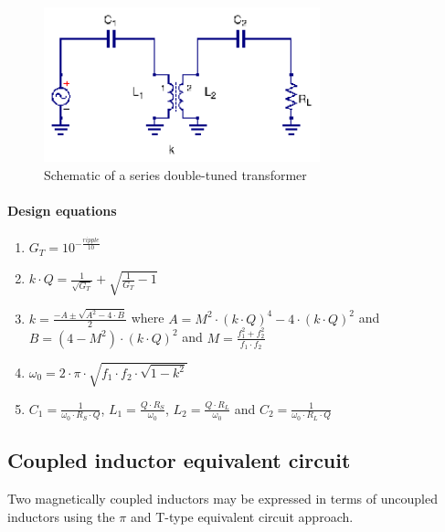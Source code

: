 \begin{figure}[H]
\centering
\includegraphics[width=80mm]{./images/Synthesis/Impedance_Matching/series-double-tuned-transformer}
\caption{Schematic of a series double-tuned transformer}
\label{fig:series-double-tuned-transformer}
\end{figure}

\paragraph{Design equations \cite{RFMW_amp_osc_Abrie}}

\begin{enumerate}
   \item $G_T = 10^{- \frac{ripple}{10}}$
   \item $k\cdot Q = \frac{1}{\sqrt{G_T}} + \sqrt{\frac{1}{G_T} - 1}$
   \item $k = \frac{-A \pm \sqrt{A^2 - 4 \cdot B}}{2}$ where $A = M^2 \cdot (k\cdot Q)^4 - 4 \cdot (k\cdot Q)^2$ and $B = (4 - M^2) \cdot (k\cdot Q)^2$ and $M = \frac{f_1^2 + f_2^2}{f_1 \cdot f_2}$
   \item $\omega_0 = 2 \cdot \pi \cdot \sqrt{f_1 \cdot f_2 \cdot \sqrt{1 - k^2}}$
   \item $C_1 = \frac{1}{\omega_0 \cdot R_S \cdot Q}$, $L_1 = \frac{Q \cdot R_S}{\omega_0}$, $L_2 = \frac{Q \cdot R_L}{\omega_0}$ and $C_2 = \frac{1}{\omega_0 \cdot R_L \cdot Q}$
\end{enumerate}

\subsection{Coupled inductor equivalent circuit}

\noindent Two magnetically coupled inductors may be expressed in terms of uncoupled inductors using the $\pi$ and T-type equivalent circuit approach.

